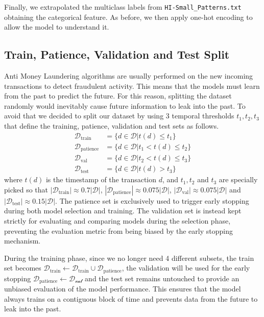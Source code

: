 Finally, we extrapolated the multiclass labels from \texttt{HI-Small\_Patterns.txt} obtaining the categorical feature. As before, we then apply one-hot encoding to allow the model to understand it.

\subsection{Train, Patience, Validation and Test Split}
Anti Money Laundering algorithms are usually performed on the new incoming transactions to detect fraudulent activity. This means that the models must learn from the past to predict the future. For this reason, splitting the dataset randomly would inevitably cause future information to leak into the past. To avoid that we decided to split our dataset by using 3 temporal thresholds \(t_1, t_2, t_3\) that define the training, patience, validation and test sets as follows.
\begin{align}
    \mathcal{D}_\text{train} &= \{d \in \mathcal{D} \vert t(d) \le t_1 \} \\
    \mathcal{D}_\text{patience} &= \{d \in \mathcal{D} \vert t_1 < t(d) \le t_2 \} \\
    \mathcal{D}_\text{val}   &= \{d \in \mathcal{D} \vert t_2 < t(d) \le t_3 \} \\
    \mathcal{D}_\text{test}  &= \{d \in \mathcal{D} \vert t(d) > t_3 \}
\end{align}
where \(t(d)\) is the timestamp of the transaction $d$, and \(t_1, t_2\) and \(t_3\) are specially picked so that \(|\mathcal{D}_\text{train}| \approx 0.7 |\mathcal{D}|\), \(|\mathcal{D}_\text{patience}| \approx 0.075 |\mathcal{D}|\), \(|\mathcal{D}_\text{val}| \approx 0.075 |\mathcal{D}|\) and \(|\mathcal{D}_\text{test}| \approx 0.15 |\mathcal{D}|\). 
The patience set is exclusively used to trigger early stopping during both model selection and training. The validation set is instead kept strictly for evaluating and comparing models during the selection phase, preventing the evaluation metric from being biased by the early stopping mechanism.

During the training phase, since we no longer need 4 different subsets, the train set becomes \(\mathcal{D}_\text{train} \gets \mathcal{D}_\text{train} \cup \mathcal{D}_\text{patience}\), the validation will be used for the early stopping \(\mathcal{D}_\text{patience} \gets \mathcal{D_\text{val}}\) and the test set remains untouched to provide an unbiased evaluation of the model performance.
This ensures that the model always trains on a contiguous block of time and prevents data from the future to leak into the past.

